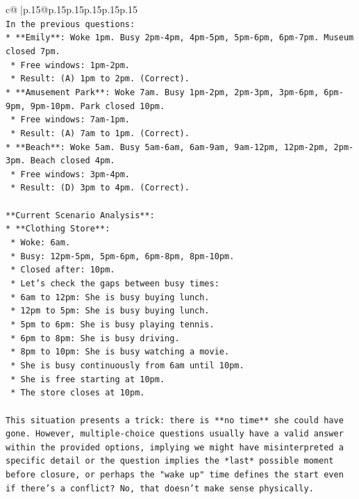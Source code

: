\documentclass{article}
\begin{document}
{\begin{supertabular}{c@{$\;$}|p{.15\linewidth}@{}p{.15\linewidth}p{.15\linewidth}p{.15\linewidth}p{.15\linewidth}p{.15\linewidth}}
{{{\\ 
\texttt{In the previous questions:} \\
\texttt{*   **Emily**: Woke 1pm. Busy 2pm{-}4pm, 4pm{-}5pm, 5pm{-}6pm, 6pm{-}7pm. Museum closed 7pm.} \\
\texttt{    *   Free windows: 1pm{-}2pm.} \\
\texttt{    *   Result: (A) 1pm to 2pm. (Correct).} \\
\texttt{*   **Amusement Park**: Woke 7am. Busy 1pm{-}2pm, 2pm{-}3pm, 3pm{-}6pm, 6pm{-}9pm, 9pm{-}10pm. Park closed 10pm.} \\
\texttt{    *   Free windows: 7am{-}1pm.} \\
\texttt{    *   Result: (A) 7am to 1pm. (Correct).} \\
\texttt{*   **Beach**: Woke 5am. Busy 5am{-}6am, 6am{-}9am, 9am{-}12pm, 12pm{-}2pm, 2pm{-}3pm. Beach closed 4pm.} \\
\texttt{    *   Free windows: 3pm{-}4pm.} \\
\texttt{    *   Result: (D) 3pm to 4pm. (Correct).} \\
\\ 
\texttt{**Current Scenario Analysis**:} \\
\texttt{*   **Clothing Store**:} \\
\texttt{    *   Woke: 6am.} \\
\texttt{    *   Busy: 12pm{-}5pm, 5pm{-}6pm, 6pm{-}8pm, 8pm{-}10pm.} \\
\texttt{    *   Closed after: 10pm.} \\
\texttt{    *   Let's check the gaps between busy times:} \\
\texttt{        *   6am to 12pm: She is busy buying lunch.} \\
\texttt{        *   12pm to 5pm: She is busy buying lunch.} \\
\texttt{        *   5pm to 6pm: She is busy playing tennis.} \\
\texttt{        *   6pm to 8pm: She is busy driving.} \\
\texttt{        *   8pm to 10pm: She is busy watching a movie.} \\
\texttt{    *   She is busy continuously from 6am until 10pm.} \\
\texttt{    *   She is free starting at 10pm.} \\
\texttt{    *   The store closes at 10pm.} \\
\\ 
\texttt{This situation presents a trick: there is **no time** she could have gone. However, multiple{-}choice questions usually have a valid answer within the provided options, implying we might have misinterpreted a specific detail or the question implies the *last* possible moment before closure, or perhaps the "wake up" time defines the start even if there's a conflict? No, that doesn't make sense physically.} \\
}}}
\end{supertabular}}
\end{document}
